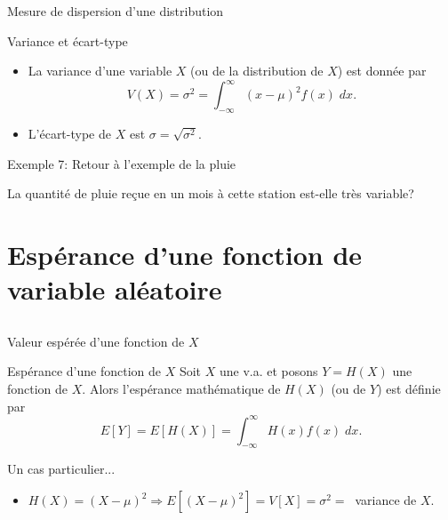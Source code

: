 \documentclass[handout]{BeamerTemplate}
\begin{document}
\begin{frame}[t]{Mesure de dispersion d'une distribution}

\begin{Boite}{Variance et écart-type}
 \begin{itemize}
  \item La \alert{variance} d'une variable $X$ (ou de la distribution de $X$)
  est donnée par
  $$V(X)=\sigma^2=\int_{-\infty}^\infty (x-\mu)^2f(x)\;dx.$$
  \item L'\alert{écart-type} de $X$ est $\sigma=\sqrt{\sigma^2}$.
 \end{itemize}
\end{Boite}
\end{frame}

\begin{frame}[t]{Exemple 7: Retour à l'exemple de la pluie}

La quantité de pluie reçue en un mois à cette station est-elle très variable?
\end{frame}

\section[Fonction de $X$]{Espérance d'une fonction de variable aléatoire }

\subsection*{ }

\begin{frame}[t]{Valeur espérée d'une fonction de $X$}

{\small
\begin{Boite}{Espérance d'une fonction de $X$}
 Soit $X$ une v.a. et posons $Y=H(X)$ une fonction
 de $X$. Alors l'\alert{espérance mathématique
 de $H(X)$} (ou de $Y$) est définie par
 $$E[Y]=E[H(X)]=\int_{-\infty}^\infty H(x)f(x)\;dx.$$
\end{Boite}
Un cas particulier...
\begin{itemize}
 \item $H(X)=(X-\mu)^2\Rightarrow E[(X-\mu)^2]=V[X]=\sigma^2=\;\;$variance de $X$.
\end{itemize}
}
\end{frame}
\end{document}
